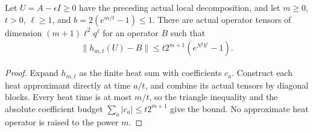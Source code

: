 \begin{lemma}
    \label{thm:soft_mpo_cluster_order}
    \leanok

    Let $U=A-\epsilon I\geq0$ have the preceding actual local
    decomposition, and let $m\geq0$, $t>0$, $\ell\geq1$, and
    $b=2(e^{m/t}-1)\leq1$. There are actual operator tensors of
    dimension $(m+1)\ell^2q^\ell$ for an operator $B$ such that
    \begin{align}
        \|h_{m,t}(U)-B\|
        \leq t2^{m+1}(e^{N^2b^\ell}-1).
        \label{eq:soft_interval_soft_cluster_error}
    \end{align}
\end{lemma}
\begin{proof}\leanok
    Expand $h_{m,t}$ as the finite heat sum with coefficients
    $c_a$. Construct each heat approximant directly at time $a/t$,
    and combine its actual tensors by diagonal blocks. Every heat
    time is at most $m/t$, so the triangle inequality and the
    absolute coefficient budget $\sum_a|c_a|\leq t2^{m+1}$ give the
    bound. No approximate heat operator is raised to the power $m$.
\end{proof}

